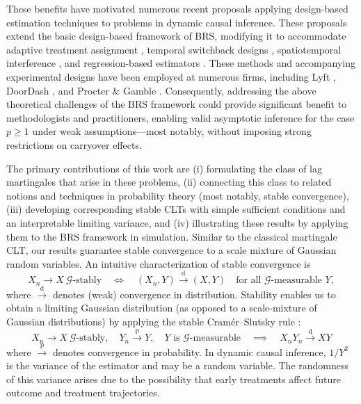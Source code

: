 \documentclass[11pt]{article}
\newcommand{\G}{\mathcal{G}}
\newcommand{\pconverge}{\overset{\mathrm{p}}{\to}}
\newcommand{\dconverge}{\overset{\mathrm{d}}{\to}}
\theoremstyle{definition}
\begin{document}
These benefits have motivated numerous recent proposals applying design-based estimation techniques to problems in dynamic causal inference.
These proposals extend the basic design-based framework of BRS, modifying it to accommodate adaptive treatment assignment \citep{ham2023design, li2026design}, temporal switchback designs \citep{hu2022switchback,bojinov2023design,zeng2026sequentially}, spatiotemporal interference \citep{ni2023design}, and regression-based estimators \citep{lin2025unifying}.
These methods and accompanying experimental designs have been employed at numerous firms, including Lyft \citep{chamandy2016experimentation}, DoorDash \citep{kastelman2018switchback}, and Procter \& Gamble \citep{ni2025reliable}.
Consequently, addressing the above theoretical challenges of the BRS framework could provide significant benefit to methodologists and practitioners, enabling valid asymptotic inference for the case $p \geq 1$ under weak assumptions---most notably, without imposing strong restrictions on carryover effects.

The primary contributions of this work are (i) formulating the class of lag martingales that arise in these problems, (ii) connecting this class to related notions and techniques in probability theory (most notably, stable convergence), (iii) developing corresponding stable CLTs with simple sufficient conditions and an interpretable limiting variance, and (iv) illustrating these results by applying them to the BRS framework in simulation.
Similar to the classical martingale CLT, our results guarantee stable convergence to a scale mixture of Gaussian random variables.
An intuitive characterization of stable convergence is \citep[Proposition VIII.5.33]{alma991060420510207861}
\[
X_n \to X \ \G\text{-stably} \quad \iff \quad (X_n, Y) \dconverge (X, Y) \quad \text{for all } \G \text{-measurable } Y,
\]
where $\dconverge$ denotes (weak) convergence in distribution.
Stability enables us to obtain a limiting Gaussian distribution (as opposed to a scale-mixture of Gaussian distributions) by applying the stable Cram\'er--Slutsky rule \citep[Theorem 3.18 (b)]{hausler_stable_2015}: 
\[
X_n \to X\  \G\text{-stably},\quad Y_n \pconverge Y,\quad Y \text{ is } \G\text{-measurable} \quad \implies \quad X_n Y_n \dconverge X Y
\]
where $\pconverge$ denotes convergence in probability.
In dynamic causal inference, $1/Y^2$ is the variance of the estimator and may be a random variable.
The randomness of this variance arises due to the possibility that early treatments affect future outcome and treatment trajectories.
\end{document}
